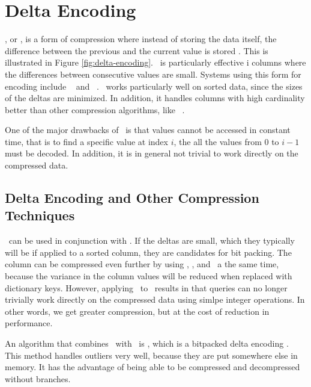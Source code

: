 \section{Delta Encoding}
\label{sec:Delta Encoding}
\dele, or , is a form of compression where instead of storing the data itself, the difference between the previous and the current value is stored \cite{Wikipedia_contributors2015-cb}. This is illustrated in Figure \ref{fig:delta-encoding}. \dele~is particularly effective i columns where the differences between consecutive values are small. Systems using this form for encoding include \vertica~\cite{Lamb2012-kg} and \blink~\cite{Raman2008-gi}. \dele~works particularly well on sorted data, since the sizes of the deltas are minimized. In addition, it handles columns with high cardinality better than other compression algorithms, like \rle~\cite{Stonebraker2005-qz}.

One of the major drawbacks of \dele~is that values cannot be accessed in constant time, that is to find a specific value at index $i$, the all the values from $0$ to $i - 1$ must be decoded. In addition, it is in general not trivial to work directly on the compressed data.

\subsection{Delta Encoding and Other Compression Techniques}
\label{sub:Delta Encoding and Other Compression Techniques}
\bp~can be used in conjunction with \dele. If the deltas are small, which they typically will be if applied to a sorted column, they are candidates for bit packing. The column can be compressed even further by using \de, \dele, and \bp~a the same time, because the variance in the column values will be reduced when replaced with dictionary keys. However, applying \dele~to \de~results in that queries can no longer trivially work directly on the compressed data using simlpe integer operations. In other words, we get greater compression, but at the cost of reduction in performance.

An algorithm that combines \dele~with \bp~is \pfdelta, which is a bitpacked delta encoding \cite{Bjorklund2011-wh}. This method handles outliers very well, because they are put somewhere else in memory. It has the advantage of being able to be compressed and decompressed without branches. 

